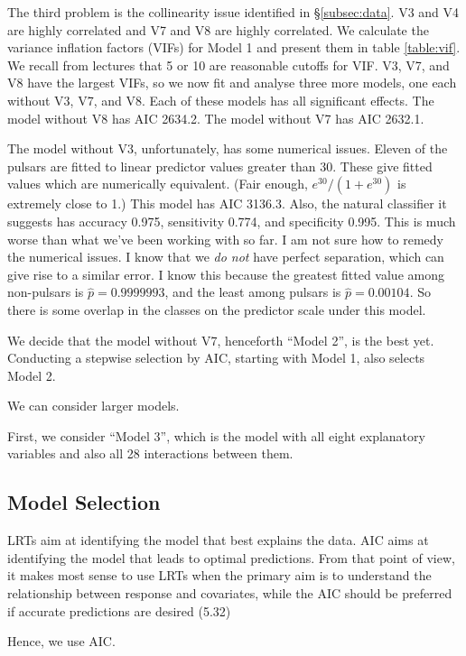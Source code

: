 \documentclass[11pt, oneside]{article}
\begin{document}
The third problem is the collinearity issue identified in \S\ref{subsec:data}. V3 and V4 are highly correlated and V7 and V8 are highly correlated. We calculate the variance inflation factors (VIFs) for Model 1 and present them in table \ref{table:vif}. We recall from lectures that 5 or 10 are reasonable cutoffs for VIF. V3, V7, and V8 have the largest VIFs, so we now fit and analyse three more models, one each without V3, V7, and V8. Each of these models has all significant effects. The model without V8 has AIC 2634.2. The model without V7 has AIC 2632.1. 

The model without V3, unfortunately, has some numerical issues. Eleven of the pulsars are fitted to linear predictor values greater than 30. These give fitted values which are numerically equivalent. (Fair enough, $e^{30} / (1 + e^{30})$ is extremely close to 1.) This model has AIC 3136.3. Also, the natural classifier it suggests has accuracy 0.975, sensitivity 0.774, and specificity 0.995. This is much worse than what we've been working with so far. 
I am not sure how to remedy the numerical issues. I know that we \emph{do not} have perfect separation, which can give rise to a similar error. I know this because the greatest fitted value among non-pulsars is $\hat{p} = 0.9999993$, and the least among pulsars is $\hat{p} = 0.00104$. So there is some overlap in the classes on the predictor scale under this model. 

We decide that the model without V7, henceforth ``Model 2'', is the best yet. Conducting a stepwise selection by AIC, starting with Model 1, also selects Model 2. 

We can consider larger models. 

First, we consider ``Model 3'', which is the model with all eight explanatory variables and also all 28 interactions between them. 

\subsection{Model Selection}

LRTs aim at identifying the model that best explains the data. AIC aims at identifying the model that leads to optimal predictions. From that point of view, it makes most sense to use LRTs when the primary aim is to understand the relationship between response and covariates, while the AIC should be preferred if accurate predictions are desired (5.32)

Hence, we use AIC. 
\end{document}
